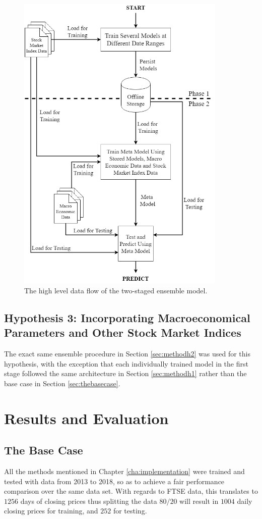 \documentclass{UoYCSproject}
\begin{document}
\begin{figure}[h]
\includegraphics[width=10cm]{Meta-model.png}
\centering
\caption{The high level data flow of the two-staged ensemble model.} 
\label{fig:metamodelflow}
\end{figure}


\section{Hypothesis 3: Incorporating Macroeconomical Parameters and Other Stock Market Indices}
\label{sec:methodh3}
The exact same ensemble procedure in Section \ref{sec:methodh2} was used for this hypothesis, with the exception that each individually trained model in the first stage followed the same architecture in Section \ref{sec:methodh1} rather than the base case in Section \ref{sec:thebasecase}. 

\chapter{Results and Evaluation}
\section{The Base Case}
All the methods mentioned in Chapter \ref{cha:implementation} were trained and tested with data from 2013 to 2018, so as to achieve a fair performance comparison over the same data set. With regards to FTSE data, this translates to $1256$ days of closing prices thus splitting the data $80/20$ will result in $1004$ daily closing prices for training, and $252$ for testing.
\end{document}
